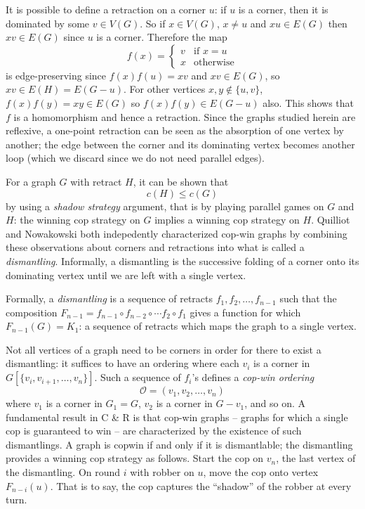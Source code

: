 It is possible to define a retraction on a corner $u$: if $u$ is a corner, then it is
dominated by some $v \in V(G)$. So if $x \in V(G)$, $x \neq u$ and
$xu \in E(G)$ then $xv \in E(G)$ since $u$ is a corner. Therefore the map
\[ f(x) = \begin{cases}
v & \text{if } x = u \\
x & \text{otherwise}
\end{cases} \]
is edge-preserving since $f(x)f(u) = xv$ and $xv \in E(G)$, so $xv \in E(H) = E(G - u)$.
For other vertices $x,y \not\in \{u,v\}$, $f(x)f(y) = xy \in E(G)$ so $f(x)f(y) \in E(G- u)$ also.
This shows that $f$ is a homomorphism and hence a retraction. Since the graphs studied herein are reflexive, a one-point retraction can be seen as the absorption of one vertex by another; the edge between the corner and its dominating vertex becomes another loop (which we discard since we do not need parallel edges).

For a graph $G$ with retract $H$, it can be shown \cite{berarducci1993cop} that
\[ c(H) \leq c(G) \]
by using a \textit{shadow strategy} argument, that is by playing parallel games on $G$ and $H$: the winning cop strategy on $G$ implies a winning cop strategy on $H$. Quilliot and Nowakowski both indepedently characterized cop-win graphs by combining these observations about corners and retractions into what is called a \textit{dismantling}. Informally, a dismantling is the successive folding of a corner onto its dominating vertex until we are left with a single vertex.

Formally, a \textit{dismantling} is a sequence of retracts $f_1, f_2, \dots, f_{n-1}$ such that the
composition $F_{n-1} = f_{n-1} \circ f_{n-2} \circ \cdots f_2 \circ f_1$ gives a
function for which $F_{n-1} (G) = K_1$: a sequence of retracts
which maps the graph to a single vertex.

Not all vertices of a graph need to be corners in order for there
to exist a dismantling: it suffices to have an ordering where each $v_i$ is a corner in
$G[\{v_i, v_{i+1}, \dots, v_n\}]$. Such a sequence of $f_i$'s defines a \textit{cop-win ordering}
\[ \mathcal{O} = ( v_1, v_2, \dots, v_n ) \]
where $v_1$ is a corner in $G_1 = G$, $v_2$ is a corner in $G - v_1$, and so on. A fundamental result in C \& R is that cop-win graphs -- graphs for which a single
cop is guaranteed to win --  are characterized by the existence of such dismantlings.
A graph is copwin if and only if it is dismantlable; the dismantling provides a winning cop strategy as follows. Start the cop on $v_n$, the last vertex of the dismantling. On round $i$ with robber on $u$, move the cop onto vertex $F_{n-i}(u)$. That is to say, the cop captures the ``shadow'' of the robber at every turn.

